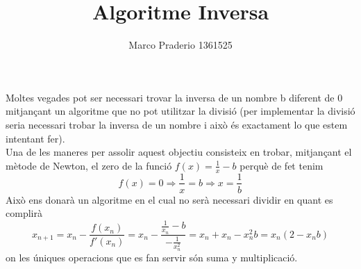 \documentclass[a4paper,10pt]{article}
\title{Algoritme Inversa}
\author{Marco Praderio 1361525}
\date{}
\renewcommand{\*}{\cdot}
\begin{document}
\maketitle
Moltes vegades pot ser necessari trovar la inversa de un nombre b diferent de 0 mitjançant un algoritme que no pot utilitzar la divisió (per implementar la divisió seria
necessari trobar la inversa de un nombre i això és exactament lo que estem intentant fer).\\
Una de les maneres per assolir aquest objectiu consisteix en trobar, mitjançant el mètode de Newton, el zero de la funció $f(x)=\frac{1}{x}-b$ perquè de fet tenim
\begin{equation*}
f(x)=0 \Rightarrow \frac{1}{x}=b \Rightarrow x=\frac{1}{b} 
\end{equation*}
Això ens donarà un algoritme en el cual no serà necessari dividir en quant es complirà
\begin{equation*}
x_{n+1}=x_n-\frac{f(x_n)}{f'(x_n)}=x_n-\frac{\frac{1}{x_n}-b}{-\frac{1}{x_n^2}}=x_n+x_n-x_n^2b=x_n(2-x_nb)
\end{equation*}
on les úniques operacions que es fan servir són suma y multiplicació.
\end{document}
